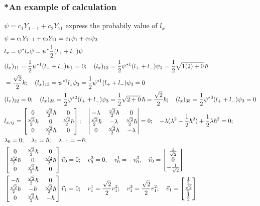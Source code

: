 \documentclass{article}
\begin{document}
\subsubsection{*An example of calculation}
$\psi=c_1Y_{1-1}+c_2Y_{11}$ express the probabily value of $l_x$
\begin{align}
&\psi=c_1Y_{1-1}+c_2Y_{11}=c_1\psi_1+c_2\psi_3\notag\\
&\overline{l_x}=\psi^*l_x\psi=\psi^*\frac12(l_{+}+l_{-})\psi\notag\\
&(l_x)_{11}=\frac12\psi^{*1}(l_{+}+l_{-})\psi_1=0;\quad (l_x)_{12}=\frac12\psi^{*1}(l_{+}+l_{-})\psi_2=\frac12\sqrt{1(2)+0}\,\hbar\notag\\
&=\frac{\sqrt{2}}2\hbar;\quad (l_x)_{13}=\psi^{*1}l_x\psi_3=\frac12\psi^{*1}(l_{+}+l_{-})\psi_3=0 \notag\\
&(l_x)_{22}=0;\quad (l_x)_{23}=\frac12\psi^{*2}(l_{+}+l_{-})\psi_3=\frac12\sqrt{2+0}\,\hbar=\frac{\sqrt{2}}2\hbar;\quad (l_x)_{33}=\frac12\psi^{*3}(l_{+}+l_{-})\psi_3=0 \notag\\
& l_{x,ij}=\begin{bmatrix}0&\frac{\sqrt{2}}2\hbar&0\\\frac{\sqrt{2}}2\hbar&0&\frac{\sqrt{2}}2\hbar\\0&\frac{\sqrt{2}}2\hbar&0\end{bmatrix};\quad\begin{vmatrix}-\lambda&\frac{\sqrt{2}}2\hbar&0\\\frac{\sqrt{2}}2\hbar&-\lambda&\frac{\sqrt{2}}2\hbar\\0&\frac{\sqrt{2}}2\hbar&-\lambda\end{vmatrix}=0;\quad-\lambda(\lambda^2-\frac12\hbar^2)+\frac12\lambda\hbar^2=0;\notag\\
&\lambda_0=0;\quad\lambda_1=\hbar;\quad\lambda_{-1}=-\hbar;\notag \\
&\begin{bmatrix}0&\frac{\sqrt{2}}2\hbar&0\\\frac{\sqrt{2}}2\hbar&0&\frac{\sqrt{2}}2\hbar\\0&\frac{\sqrt{2}}2\hbar&0\end{bmatrix}\vec v_0=0;\quad v_0^2=0,\quad v_0^1=-v_0^3,\quad \vec v_0=\begin{bmatrix}\frac1{\sqrt{2}}\\0\\-\frac1{\sqrt{2}}\end{bmatrix} \notag \\
&\begin{bmatrix}-\hbar&\frac{\sqrt{2}}2\hbar&0\\\frac{\sqrt{2}}2\hbar&-\hbar&\frac{\sqrt{2}}2\hbar\\0&\frac{\sqrt{2}}2\hbar&-\hbar\end{bmatrix}\vec v_1=0;\quad v_1^1=\frac{\sqrt{2}}2v_1^2;\quad v_1^3=\frac{\sqrt{2}}2v_1^2;\quad \vec v_1=\begin{bmatrix}\frac12\\\frac{\sqrt{2}}2\\\frac12\end{bmatrix} \notag\\

\end{align}
\end{document}
